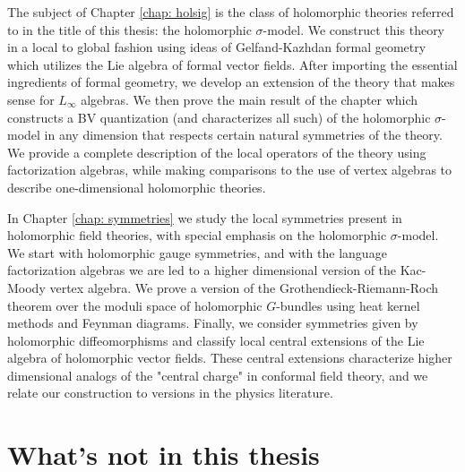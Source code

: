 The subject of Chapter \ref{chap: holsig} is the class of holomorphic theories referred to in the title of this thesis: the holomorphic $\sigma$-model.
We construct this theory in a local to global fashion using ideas of Gelfand-Kazhdan formal geometry which utilizes the Lie algebra of formal vector fields. 
After importing the essential ingredients of formal geometry, we develop an extension of the theory that makes sense for $L_\infty$ algebras.
We then prove the main result of the chapter which constructs a BV quantization (and characterizes all such) of the holomorphic $\sigma$-model in any dimension that respects certain natural symmetries of the theory.
We provide a complete description of the local operators of the theory using factorization algebras, while making comparisons to the use of vertex algebras to describe one-dimensional holomorphic theories. 

In Chapter \ref{chap: symmetries} we study the local symmetries present in holomorphic field theories, with special emphasis on the holomorphic $\sigma$-model.
We start with holomorphic gauge symmetries, and with the language factorization algebras we are led to a higher dimensional version of the Kac-Moody vertex algebra.
We prove a version of the Grothendieck-Riemann-Roch theorem over the moduli space of holomorphic $G$-bundles using heat kernel methods and Feynman diagrams. 
Finally, we consider symmetries given by holomorphic diffeomorphisms and classify local central extensions of the Lie algebra of holomorphic vector fields. 
These central extensions characterize higher dimensional analogs of the "central charge" in conformal field theory, and we relate our construction to versions in the physics literature. 

\section{What's not in this thesis}
